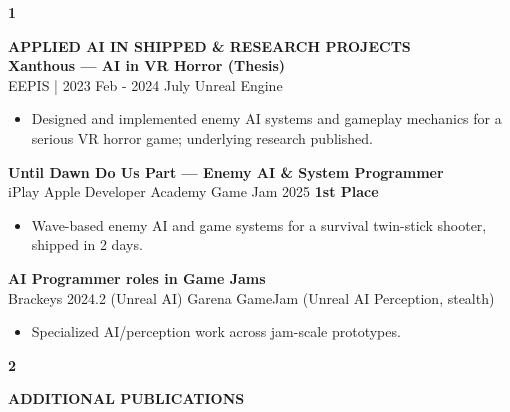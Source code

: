 \documentclass[11pt,a4paper]{article}
\begin{document}
\hspace{1cm}
\begin{minipage}[t]{18cm}

\begin{minipage}[t]{0.8cm}
{\Large\bfseries 1}
\end{minipage}%
\begin{minipage}[t]{17cm}
{\large\bfseries APPLIED AI IN SHIPPED \& RESEARCH PROJECTS}\\[8pt]

\textbf{Xanthous — AI in VR Horror (Thesis)}\\
{\small EEPIS | 2023 Feb - 2024 July \textbar{} Unreal Engine}
\begin{itemize}[leftmargin=*, nosep, itemsep=2pt, topsep=2pt]
    \item Designed and implemented enemy AI systems and gameplay mechanics for a serious VR horror game; underlying research published.
\end{itemize}

\vspace{0.3cm}

\textbf{Until Dawn Do Us Part — Enemy AI \& System Programmer}\\
{\small iPlay Apple Developer Academy Game Jam 2025 \textbar{} \textbf{1st Place}}
\begin{itemize}[leftmargin=*, nosep, itemsep=2pt, topsep=2pt]
    \item Wave-based enemy AI and game systems for a survival twin-stick shooter, shipped in 2 days.
\end{itemize}

\vspace{0.3cm}

\textbf{AI Programmer roles in Game Jams}\\
{\small Brackeys 2024.2 (Unreal AI) \textbar{} Garena GameJam (Unreal AI Perception, stealth)}
\begin{itemize}[leftmargin=*, nosep, itemsep=2pt, topsep=2pt]
    \item Specialized AI/perception work across jam-scale prototypes.
\end{itemize}

\end{minipage}

\vspace{0.5cm}

\begin{minipage}[t]{0.8cm}
{\Large\bfseries 2}
\end{minipage}%
\begin{minipage}[t]{17cm}
{\large\bfseries ADDITIONAL PUBLICATIONS}\\[8pt]


\end{minipage}
\end{minipage}
\end{document}
